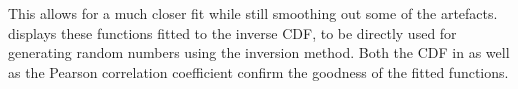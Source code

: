 This allows for a much closer fit while still smoothing out some of the artefacts.
 displays these functions fitted to the inverse \gls{CDF}, to be directly used for generating random numbers using the inversion method.
Both the \gls{CDF} in  as well as the Pearson correlation coefficient confirm the goodness of the fitted functions.
